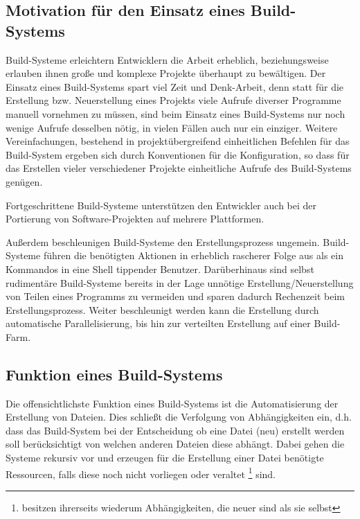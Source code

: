 \subsection{Motivation für den Einsatz eines Build-Systems} 

Build-Systeme erleichtern Entwicklern die Arbeit erheblich, beziehungsweise
erlauben ihnen große und komplexe Projekte überhaupt zu bewältigen.
%
Der Einsatz eines Build-Systems spart viel Zeit und Denk-Arbeit,
denn statt für die Erstellung bzw. Neuerstellung eines Projekts viele
Aufrufe diverser Programme manuell vornehmen zu müssen, sind beim Einsatz eines
Build-Systems nur noch wenige Aufrufe desselben nötig, in vielen Fällen auch
nur ein einziger.
%
Weitere Vereinfachungen, bestehend in projektübergreifend einheitlichen Befehlen
für das Build-System ergeben sich durch Konventionen für die Konfiguration, so
dass für das Erstellen vieler verschiedener Projekte einheitliche Aufrufe des
Build-Systems genügen.

Fortgeschrittene Build-Systeme unterstützen den Entwickler auch bei der
Portierung von Software-Projekten auf mehrere Plattformen. %

Außerdem beschleunigen Build-Systeme den Erstellungsprozess ungemein.
Build-Systeme führen die benötigten Aktionen in erheblich rascherer Folge aus
als ein Kommandos in eine Shell tippender Benutzer. 
%
Darüberhinaus sind selbst rudimentäre Build-Systeme bereits in der Lage unnötige
Erstellung/Neuerstellung von Teilen eines Programms zu vermeiden und sparen
dadurch Rechenzeit beim Erstellungsprozess.
%
Weiter beschleunigt werden kann die Erstellung durch automatische
Parallelisierung, bis hin zur verteilten Erstellung auf einer Build-Farm.

\subsection{Funktion eines Build-Systems}

Die offensichtlichste Funktion eines Build-Systems ist die Automatisierung der
Erstellung von Dateien. Dies schließt die Verfolgung von Abhängigkeiten ein,
d.h. dass das Build-System bei der Entscheidung ob eine Datei (neu) erstellt
werden soll berücksichtigt von welchen anderen Dateien diese abhängt.
%
Dabei gehen die Systeme rekursiv vor und erzeugen für die Erstellung einer Datei
benötigte Ressourcen, falls diese noch nicht vorliegen oder veraltet
\footnote{besitzen ihrerseits wiederum Abhängigkeiten, die neuer sind als sie
selbst} sind.

